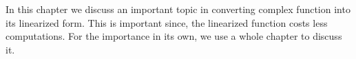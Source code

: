 In this chapter we discuss an important topic in converting complex function into its linearized form. This is important since, the linearized function costs less computations. For the importance in its own, we use a whole chapter to discuss it.